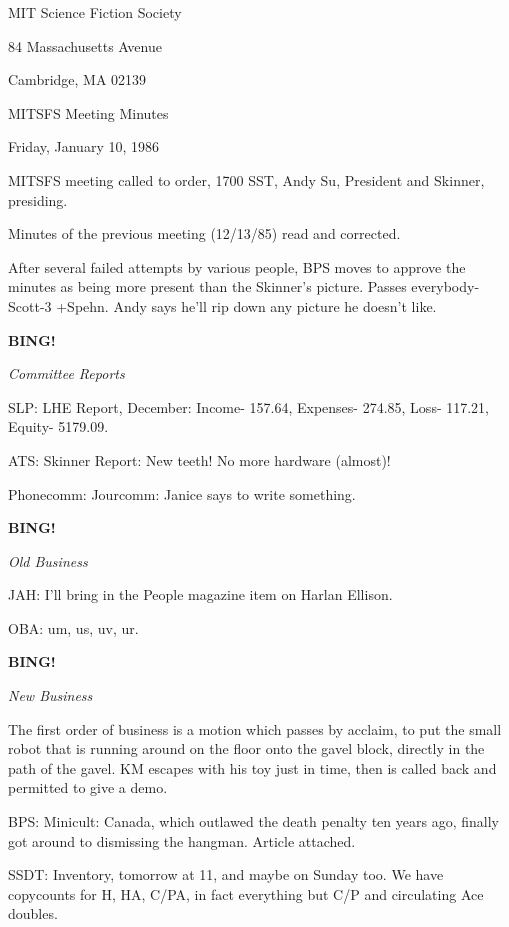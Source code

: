 \documentclass[12pt]{article}
\newcommand{\bing}{{\bf BING!} }
\newcommand{\goto}[1]{\bing \vskip 12pt \centerline{{\em{#1}}}}
\begin{document}
\begin{center}

MIT Science Fiction Society 

84 Massachusetts Avenue

Cambridge, MA 02139

\vspace{12pt}

MITSFS Meeting Minutes 

Friday, January 10, 1986

\end{center}
 
\vspace{18pt}

\setlength{\parskip}{6pt}

\noindent
MITSFS meeting called to order, 1700 SST,
Andy Su, President and Skinner, presiding.

Minutes of the previous meeting (12/13/85) read and corrected.

After several failed attempts by various people, BPS moves to approve the minutes as being more present than the Skinner's picture. Passes everybody-Scott-3 +Spehn. Andy says he'll rip down any picture he doesn't like.

\goto{Committee Reports}

SLP: LHE Report, December: Income- 157.64, Expenses- 274.85, Loss- 117.21, Equity- 5179.09.

ATS: Skinner Report: New teeth! No more hardware (almost)!

Phonecomm: Jourcomm: Janice says to write something.

\goto{Old Business}

JAH: I'll bring in the People magazine item on Harlan Ellison.

OBA: um, us, uv, ur.

\goto{New Business}

The first order of business is a motion which passes by acclaim, to put the small robot that is running around on the floor onto the gavel block, directly in the path of the gavel. KM escapes with his toy just in time, then is called back and permitted to give a demo.

BPS: Minicult: Canada, which outlawed the death penalty ten years ago, finally got around to dismissing the hangman. Article attached.

SSDT: Inventory, tomorrow at 11, and maybe on Sunday too. We have copycounts for H, HA, C/PA, in fact everything but C/P and circulating Ace doubles.
\end{document}

